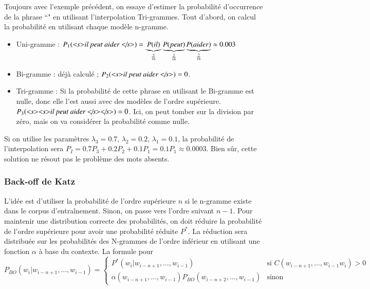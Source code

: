 \documentclass{KodeBook}
\begin{document}
Toujours avec l'exemple précédent, on essaye d'estimer la probabilité d'occurrence de la phrase ``"
en utilisant l'interpolation Tri-grammes.
Tout d'abord, on calcul la probabilité en utilisant chaque modèle n-gramme.
\begin{itemize}
	\item Uni-gramme : 
	$P_1(\text{\textit{\textless s\textgreater il peut aider \textless/s\textgreater}}) = 
	\underbrace{P(il)}_{\frac{3}{16}}
	\underbrace{P(peut)}_{\frac{2}{16}} 
	\underbrace{P(aider)}_{\frac{2}{16}} \approx 0.003$
	
	\item Bi-gramme : déjà calculé ; $P_2(\text{\textit{\textless s\textgreater il peut aider \textless/s\textgreater}})=0$.
	
	\item Tri-gramme : Si la probabilité de cette phrase en utilisant le Bi-gramme est nulle, donc elle l'est aussi avec des modèles de l'ordre supérieure. 
	$P_3(\text{\textit{\textless s\textgreater \textless s\textgreater il peut aider \textless/s\textgreater \textless/s\textgreater}})=0$.
	Ici, on peut tomber sur la division par zéro, mais on va considérer la probabilité comme nulle.
\end{itemize}
%
Si on utilise les paramètres $\lambda_3=0.7,\, \lambda_2=0.2,\, \lambda_1 = 0.1$, la probabilité de l'interpolation sera $P_I = 0.7 P_3 + 0.2 P_2 + 0.1 P_1 = 0.1 P_1 \approx 0.0003$. 
Bien sûr, cette solution ne résout pas le problème des mots absents.

\subsubsection{Back-off de Katz}

L'idée est d'utiliser la probabilité de l'ordre supérieure $n$ si le n-gramme existe dans le corpus d'entraînement. 
Sinon, on passe vers l'ordre suivant $n-1$.
Pour maintenir une distribution correcte des probabilités, on doit réduire la probabilité de l'ordre supérieure pour avoir une probabilité réduite $P^*$. 
La réduction sera distribuée sur les probabilités des N-grammes de l'ordre inférieur en utilisant une fonction $\alpha$ à base du contexte.
La formule pour 
\begin{equation}
	P_{BO}(w_i | w_{i-n+1}, \ldots, w_{i-1}) = 
	\begin{cases}
	P^*(w_i | w_{i-n+1}, \ldots, w_{i-1}) & \text{si } C(w_{i-n+1}, \ldots, w_{i-1} w_i) > 0 \\
	\alpha(w_{i-n+1}, \ldots, w_{i-1}) P_{BO}(w_{i-n+2}, \ldots, w_{i-1}) & \text{sinon}
	\end{cases}
\end{equation}
\end{document}
